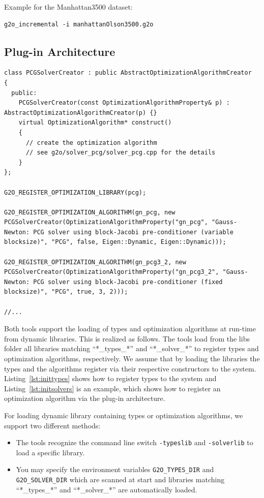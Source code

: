 \documentclass[a4paper]{article}
\begin{document}
Example for the Manhattan3500 dataset:
\begin{verbatim}
g2o_incremental -i manhattanOlson3500.g2o
\end{verbatim}

\subsection{Plug-in Architecture}

\begin{lstlisting}[float,label=lst:initsolvers,caption=Registering
  solvers by a constructor from a library]
class PCGSolverCreator : public AbstractOptimizationAlgorithmCreator
{
  public:
    PCGSolverCreator(const OptimizationAlgorithmProperty& p) : AbstractOptimizationAlgorithmCreator(p) {}
    virtual OptimizationAlgorithm* construct()
    {
      // create the optimization algorithm
      // see g2o/solver_pcg/solver_pcg.cpp for the details
    }
};

G2O_REGISTER_OPTIMIZATION_LIBRARY(pcg);

G2O_REGISTER_OPTIMIZATION_ALGORITHM(gn_pcg, new PCGSolverCreator(OptimizationAlgorithmProperty("gn_pcg", "Gauss-Newton: PCG solver using block-Jacobi pre-conditioner (variable blocksize)", "PCG", false, Eigen::Dynamic, Eigen::Dynamic)));

G2O_REGISTER_OPTIMIZATION_ALGORITHM(gn_pcg3_2, new PCGSolverCreator(OptimizationAlgorithmProperty("gn_pcg3_2", "Gauss-Newton: PCG solver using block-Jacobi pre-conditioner (fixed blocksize)", "PCG", true, 3, 2)));

//...
\end{lstlisting}

Both tools support the loading of types and optimization algorithms at
run-time from dynamic libraries. This is realized as follows. The tools
load from the libs folder all libraries matching ``*\_types\_*'' and
``*\_solver\_*'' to register types and optimization algorithms,
respectively. We assume that by loading the libraries the types and the
algorithms register via their respective constructors to the system.
Listing~\ref{lst:inittypes} shows how to register types to the system
and Listing~\ref{lst:initsolvers} is an example, which shows how to
register an optimization algorithm via the plug-in architecture.

For loading dynamic library containing types or optimization algorithms, we support two
different methods:
\begin{itemize}
  \item The tools recognize the command line switch \verb+-typeslib+
    and \verb+-solverlib+ to load a specific library.
  \item You may specify the environment variables \verb+G2O_TYPES_DIR+
    and \verb+G2O_SOLVER_DIR+ which are scanned at start and libraries
    matching ``*\_types\_*'' and ``*\_solver\_*'' are automatically
    loaded.
\end{itemize}
\end{document}
